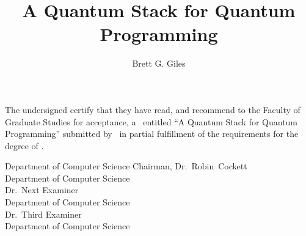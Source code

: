 \documentclass{ucalgthes}
\title{A Quantum Stack for Quantum Programming}
\author{Brett G. Giles}
\newcommand{\thesistitle}{A Quantum Stack for Quantum Programming}
\begin{document}
\makethesistitle
{}
\setcounter{page}{2}
\pagestyle{plain}
The undersigned certify that they have read, and recommend
to the Faculty of Graduate Studies for acceptance, a \Thesis\ entitled
``\thesistitle'' submitted by \Author\
in partial fulfillment of the requirements for the degree of
\Degree.

%
%
\begin{signing}{Department of Computer Science}
\signline
Chairman, Dr.~Robin~Cockett \\
Department of Computer Science \\
\signline
Dr.~Next Examiner \\
Department of Computer Science  \\
\signline
Dr.~Third Examiner \\
Department of Computer Science  \\
\end{signing}

\begin{singlespace}
\tableofcontents{}
\listoftables
\listoffigures
\end{singlespace}
\clearpage
\pagestyle{myheadings}

\end{document}
